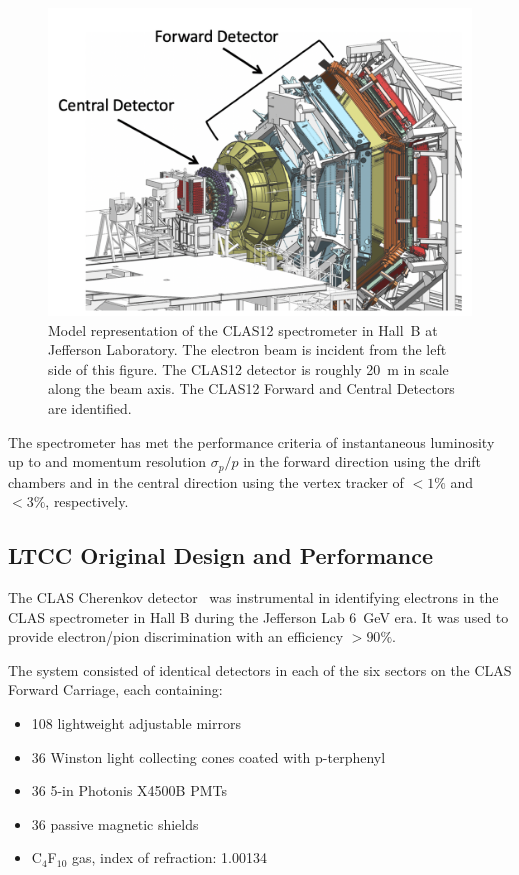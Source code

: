 \begin{figure}
    \centering
    \includegraphics[width=1.0\columnwidth,keepaspectratio]{img/clas12-model.png}
    \caption{ Model representation of the CLAS12 spectrometer in Hall~B at Jefferson Laboratory. The electron
              beam is incident from the left side of this figure. The CLAS12 detector is roughly 20~m in scale along the
              beam axis. The CLAS12 Forward and Central Detectors are identified.}
        \label{fig:clas12-model}
\end{figure}

The spectrometer has met the performance criteria of instantaneous luminosity up
to \cLuminosity and momentum resolution $\sigma_p/p$ in the forward direction using the drift chambers and in the central
direction using the vertex tracker of $< 1\%$ and $< 3\%$, respectively.


\subsection{LTCC Original Design and Performance}

The CLAS Cherenkov detector~\cite{Adams:2001kk} was instrumental in identifying electrons in the CLAS
spectrometer in Hall B during the Jefferson Lab 6~GeV era. It was used to provide electron/pion discrimination
with an efficiency $> 90\%$.

The system consisted of identical detectors in each of the six sectors on the CLAS Forward Carriage, each
containing:

\begin{itemize}
	\item 108 lightweight adjustable mirrors
	\item 36 Winston light collecting cones coated with p-terphenyl
	\item 36 5-in Photonis X4500B PMTs
	\item 36 passive magnetic shields
	\item C$_4$F$_{10}$ gas, index of refraction: 1.00134
\end{itemize}

